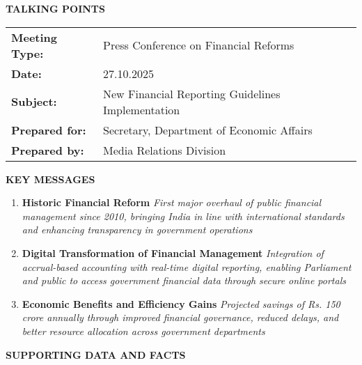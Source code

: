 \documentclass[12pt,a4paper]{article}
\newcommand{\talkingheader}[1]{\textbf{\color{govblue}#1}}
\newcommand{\keymessage}[1]{\textbf{\color{accentgreen}\ding{226} #1}}
\newcommand{\supporting}[1]{\textit{#1}}
\begin{document}
\begin{center}
    {\large \textbf{TALKING POINTS}}
\end{center}

\vspace{0.3cm}

\begin{table}[h]
\centering
\begin{tabular}{@{}ll@{}}
\toprule
\textbf{Meeting Type:} & Press Conference on Financial Reforms \\
\textbf{Date:} & 27.10.2025 \\
\textbf{Subject:} & New Financial Reporting Guidelines Implementation \\
\textbf{Prepared for:} & Secretary, Department of Economic Affairs \\
\textbf{Prepared by:} & Media Relations Division \\
\bottomrule
\end{tabular}
\end{table}

\vspace{0.5cm}

\talkingheader{KEY MESSAGES}

\begin{enumerate}[leftmargin=*, itemsep=8pt]
    \item \keymessage{Historic Financial Reform}
    \supporting{First major overhaul of public financial management since 2010, bringing India in line with international standards and enhancing transparency in government operations}

    \item \keymessage{Digital Transformation of Financial Management}
    \supporting{Integration of accrual-based accounting with real-time digital reporting, enabling Parliament and public to access government financial data through secure online portals}

    \item \keymessage{Economic Benefits and Efficiency Gains}
    \supporting{Projected savings of Rs. 150 crore annually through improved financial governance, reduced delays, and better resource allocation across government departments}
\end{enumerate}

\vspace{0.5cm}

\talkingheader{SUPPORTING DATA AND FACTS}
\end{document}
